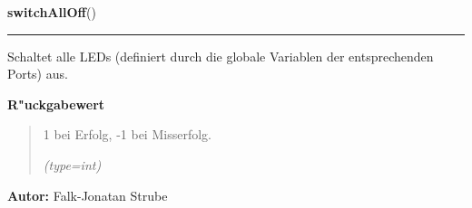 \hspace{.8\funcindent}\begin{boxedminipage}{\funcwidth}

    \raggedright \textbf{switchAllOff}()

    \vspace{-1.5ex}

    \rule{\textwidth}{0.5\fboxrule}
\setlength{\parskip}{2ex}
    Schaltet alle LEDs (definiert durch die globale Variablen der 
    entsprechenden Ports) aus.

\setlength{\parskip}{1ex}
      \textbf{R"uckgabewert}
    \vspace{-1ex}

      \begin{quote}
      1 bei Erfolg, -1 bei Misserfolg.

      {\it (type=int)}

      \end{quote}

\textbf{Autor:} Falk-Jonatan Strube



    \end{boxedminipage}

    \label{ledleuchtturm:ledFunc:blink}

    \vspace{0.5ex}

